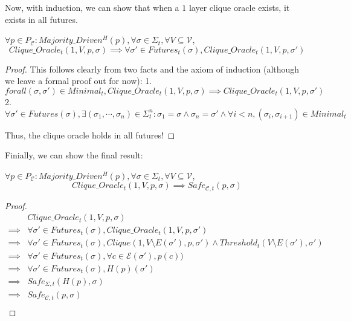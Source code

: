 Now, with induction, we can show that when a $1$ layer clique oracle exists, it exists in all futures.


\begin{lemma}
$\forall p \in P_{\mathcal{C}} : Majority\_Driven^H(p), \forall \sigma \in \Sigma_t, \forall V \subseteq \mathcal{V}$,
$$
Clique\_Oracle_t(1, V, p, \sigma) \implies \forall \sigma' \in Futures_t(\sigma), Clique\_Oracle_t(1, V, p, \sigma')
$$
\end{lemma}

\begin{proof}
This follows clearly from two facts and the axiom of induction (although we leave a formal proof out for now):
1. $forall (\sigma, \sigma') \in Minimal_t, Clique\_Oracle_t(1, V, p, \sigma) \implies Clique\_Oracle_t(1, V, p, \sigma')$
2. $\forall \sigma' \in Futures(\sigma), \exists (\sigma_1, \cdots , \sigma_{n}) \in \Sigma_t^n : \sigma_1 = \sigma \land \sigma_n = \sigma' \land \forall i < n, (\sigma_i, \sigma_{i + 1}) \in Minimal_t$

Thus, the clique oracle holds in all futures!
\end{proof}


Finially, we can show the final result:

\begin{lemma}
$\forall p \in P_{\mathcal{C}} : Majority\_Driven^H(p), \forall \sigma \in \Sigma_t, \forall V \subseteq \mathcal{V}$,
$$
Clique\_Oracle_t(1, V, p, \sigma) \implies Safe_{\mathcal{C},t}(p, \sigma)
$$
\end{lemma}

\begin{proof}
  \begin{align}
    &Clique\_Oracle_t(1, V, p, \sigma) \\
    \implies& \forall \sigma' \in Futures_t(\sigma), Clique\_Oracle_t(1, V, p, \sigma') \\
    \implies& \forall \sigma' \in Futures_t(\sigma), Clique(1, V \setminus E(\sigma'), p, \sigma') \land Threshold_t(V \setminus E(\sigma'), \sigma') \\
    \implies& \forall \sigma' \in Futures_t(\sigma), \forall c \in \mathcal{E}(\sigma'), p(c) ) \\
    \implies& \forall \sigma' \in Futures_t(\sigma), H(p)(\sigma') \\
    \implies& Safe_{\Sigma,t}(H(p), \sigma) \\
    \implies& Safe_{\mathcal{C},t}(p, \sigma) \\
  \end{align}
\end{proof}
